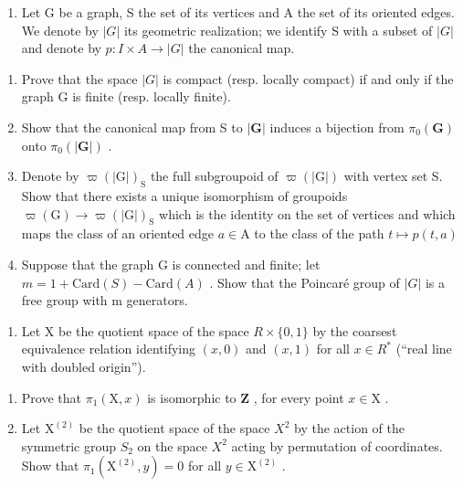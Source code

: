\begin{enumerate}
\def\labelenumi{\arabic{enumi})}
\setcounter{enumi}{6}
\tightlist
\item
  Let G be a graph, S the set of its vertices and A the set of its oriented edges. We denote by \(|G|\) its geometric realization; we identify S with a subset of \(|G|\) and denote by \(p: I \times A \rightarrow |G|\) the canonical map.
\end{enumerate}

\begin{enumerate}
\def\labelenumi{\alph{enumi})}
\item
  Prove that the space \(|G|\) is compact (resp. locally compact) if and only if the graph G is finite (resp. locally finite).
\item
  Show that the canonical map from S to \(|\mathbf{G}|\) induces a bijection from \(\pi_0(\mathbf{G})\) onto \(\pi_0(|\mathbf{G}|)\) .
\item
  Denote by \(\varpi(|\mathrm{G}|)_\mathrm{S}\) the full subgroupoid of \(\varpi(|\mathrm{G}|)\) with vertex set S. Show that there exists a unique isomorphism of groupoids \(\varpi (\mathrm{G})\to \varpi (|\mathrm{G}|)_{\mathrm{S}}\) which is the identity on the set of vertices and which maps the class of an oriented edge \(a\in \mathrm{A}\) to the class of the path \(t\mapsto p(t,a)\)
\item
  Suppose that the graph G is connected and finite; let \(m = 1 + \text{Card}(S) - \text{Card}(A)\) . Show that the Poincaré group of \(|G|\) is a free group with m generators.
\end{enumerate}

\begin{enumerate}
\def\labelenumi{\arabic{enumi})}
\setcounter{enumi}{7}
\tightlist
\item
  Let X be the quotient space of the space \(R \times \{0,1\}\) by the coarsest equivalence relation identifying \((x,0)\) and \((x,1)\) for all \(x \in R^{*}\) (“real line with doubled origin”).
\end{enumerate}

\begin{enumerate}
\def\labelenumi{\alph{enumi})}
\item
  Prove that \(\pi_1(\mathrm{X},x)\) is isomorphic to \(\mathbf{Z}\) , for every point \(x\in \mathrm{X}\) .
\item
  Let \(\mathrm{X}^{(2)}\) be the quotient space of the space \(X^{2}\) by the action of the symmetric group \(S_{2}\) on the space \(X^{2}\) acting by permutation of coordinates. Show that \(\pi_{1}(\mathrm{X}^{(2)},y)=0\) for all \(y\in\mathrm{X}^{(2)}\) .
\end{enumerate}

